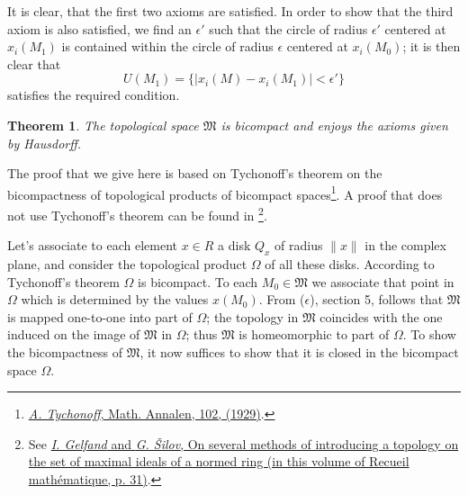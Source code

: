 \documentclass{article}
\newtheorem{theorem}{Theorem}
\theoremstyle{definition}
\begin{document}
It is clear, that the first two axioms are satisfied. In order to show that the third axiom is also satisfied, we find an $\epsilon'$ such that the circle of radius $\epsilon'$ centered at $x_i(M_1)$ is contained within the circle of radius $\epsilon$ centered at $x_i(M_0)$; it is then clear that
$$ U(M_1) = \{|x_i(M) - x_i(M_1)| < \epsilon'\} $$
satisfies the required condition.

\begin{theorem}
  The topological space $\mathfrak{M}$ is bicompact and enjoys the axioms given by Hausdorff.
\end{theorem}

The proof that we give here is based on Tychonoff's theorem on the bicompactness of topological products of bicompact spaces\footnote{\href{https://sci-hub.st/https://link.springer.com/article/10.1007/BF01782364}{\emph{A. Tychonoff}, Math. Annalen, 102, (1929)}.}. A proof that does not use Tychonoff's theorem can be found in \footnote{See \href{http://www.mathnet.ru/links/253be47c30469d06812d656be551fd8a/sm6047.pdf}{\emph{I. Gelfand} and \emph{G. \v{S}ilov}, On several methods of introducing a topology on the set of maximal ideals of a normed ring (in this volume of Recueil mathématique, p. 31)}.}.

Let's associate to each element $x\in R$ a disk $Q_x$ of radius $\|x\|$ in the complex plane, and consider the topological product $\Omega$ of all these disks. According to Tychonoff's theorem $\Omega$ is bicompact. To each $M_0\in\mathfrak{M}$ we associate that point in $\Omega$ which is determined by the values $x(M_0)$. From ($\epsilon$), section 5, follows that $\mathfrak{M}$ is mapped one-to-one into part of $\Omega$; the topology in $\mathfrak{M}$ coincides with the one induced on the image of $\mathfrak{M}$ in $\Omega$; thus $\mathfrak{M}$ is homeomorphic to part of $\Omega$. To show the bicompactness of $\mathfrak{M}$, it now suffices to show that it is closed in the bicompact space $\Omega$.
\end{document}
